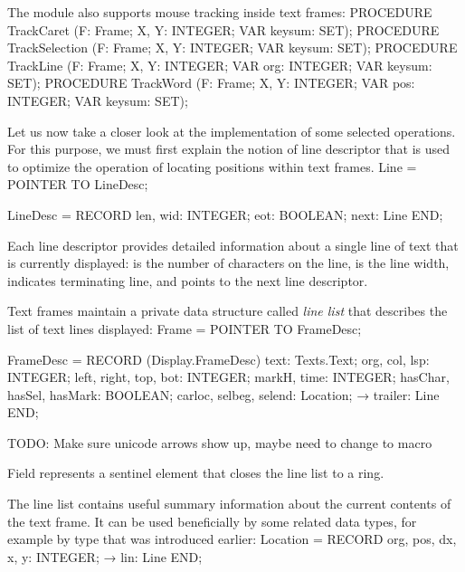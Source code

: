 \noindent The module also supports mouse tracking inside text frames:
\begintt
PROCEDURE TrackCaret (F: Frame; X, Y: INTEGER; VAR keysum: SET);
PROCEDURE TrackSelection (F: Frame; X, Y: INTEGER; VAR keysum: SET);
PROCEDURE TrackLine (F: Frame; X, Y: INTEGER; VAR org: INTEGER; VAR keysum: SET);
PROCEDURE TrackWord (F: Frame; X, Y: INTEGER; VAR pos: INTEGER; VAR keysum: SET);
\endtt

\noindent Let us now take a closer look at the implementation of some selected operations. For this purpose, we must first explain the notion of line descriptor that is used to optimize the operation of locating positions within text frames.
\begintt
Line = POINTER TO LineDesc;

LineDesc = RECORD
  len, wid: INTEGER;
  eot: BOOLEAN;
  next: Line
END;
\endtt

\noindent Each line descriptor provides detailed information about a single line of text that is currently displayed:  is the number of characters on the line,  is the line width,  indicates terminating line, and  points to the next line descriptor.

Text frames maintain a private data structure called \emph{line list} that describes the list of text lines displayed:
\begintt
Frame = POINTER TO FrameDesc;

FrameDesc = RECORD (Display.FrameDesc)
  text: Texts.Text;
  org, col, lsp: INTEGER;
  left, right, top, bot: INTEGER;
  markH, time: INTEGER;
  hasChar, hasSel, hasMark: BOOLEAN;
  carloc, selbeg, selend: Location;
→ trailer: Line
END;
\endtt

TODO: Make sure unicode arrows show up, maybe need to change to macro

Field  represents a sentinel element that closes the line list to a ring.

The line list contains useful summary information about the current contents of the text frame. It can be used beneficially by some related data types, for example by type  that was introduced earlier:
\begintt
Location = RECORD
  org, pos, dx, x, y: INTEGER;
→ lin: Line
END;
\endtt


